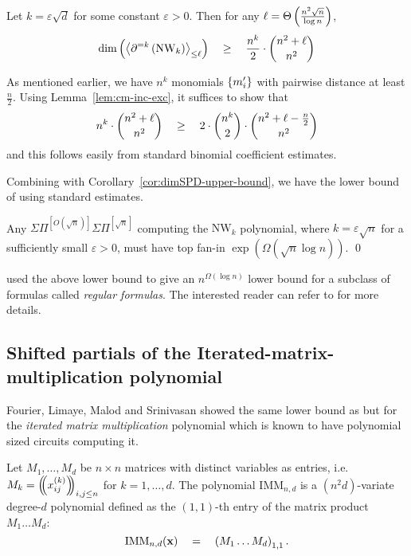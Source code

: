 \documentclass[12pt]{report}
\newcommand{\SPD}[3]{\inangle{\partial^{=#1}\inparen{#3}}_{\leq #2}}
\newcommand{\mySPSP}[2]{\Sigma\Pi^{[#1]}\Sigma\Pi^{[#2]}}
\renewcommand{\epsilon}{\varepsilon}
\begin{document}
\begin{theorem}
Let $k = \epsilon \sqrt{d}$ for some constant $\epsilon > 0$. Then for any  $\ell = \Theta\left(\frac{n^2 \sqrt{n}}{\log n}\right)$,
$$
\dim\inparen{\SPD{k}{\ell}{\mathrm{NW}_k}} \spaced{\geq} \frac{n^k}{2} \cdot \binom{n^2 + \ell}{n^2}
$$
\end{theorem}
\begin{proof-sketch}
As mentioned earlier, we have $n^k$ monomials $\left\{m_i'\right\}$ with pairwise distance at least $\frac{n}{2}$. Using Lemma~\ref{lem:cm-inc-exc}, it suffices to show that
$$
n^k \cdot \binom{n^2 + \ell}{n^2} \quad \geq \quad 2 \cdot \binom{n^k}{2} \cdot \binom{n^2 + \ell - \frac{n}{2}}{n^2}
$$
and this follows easily from standard binomial coefficient estimates. 
\end{proof-sketch}

Combining with Corollary~\ref{cor:dimSPD-upper-bound}, we have the lower bound of \cite{KSS13} using standard estimates. 

\begin{theorem}
Any $\mySPSP{O(\sqrt{n})}{\sqrt{n}}$ computing the $\mathrm{NW}_k$ polynomial, where $k = \epsilon \sqrt{n}$ for a sufficiently small $\epsilon > 0$, must have top fan-in $\exp(\Omega(\sqrt{n}\log n))$. \qed
\end{theorem}

\cite{KSS13} used the above lower bound to give an $n^{\Omega(\log n)}$ lower bound for a subclass of formulas called \emph{regular formulas}. The interested reader can refer to \cite{KSS13} for more details. 

\subsection{Shifted partials of the Iterated-matrix-multiplication polynomial}

Fourier, Limaye, Malod and Srinivasan \cite{FLMS13} showed the same lower bound as \cite{KSS13} but for the \emph{iterated matrix multiplication} polynomial which is known to have polynomial sized circuits computing it. 

\begin{definition}
Let $M_1,\dots, M_d$ be $n\times n$ matrices with distinct variables as entries, i.e. $M_k = \left(\!\!\left(x_{ij}^{(k)}\right)\!\!\right)_{i,j\leq n}$ for $k = 1,\dots, d$. The polynomial $\mathrm{IMM}_{n,d}$ is a $(n^2d)$-variate degree-$d$ polynomial defined as the $(1,1)$-th entry of the matrix product $M_1\dots M_d$:
$$
\mathrm{IMM}_{n,d}(\mathbf{x}) \quad = \quad \left(M_1 \dots M_d\right)_{1,1}.
$$
\end{definition}
\end{document}
